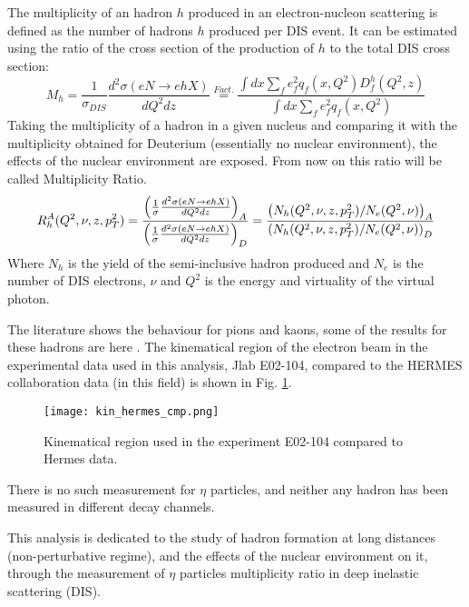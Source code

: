 The multiplicity of an hadron $h$ produced in an electron-nucleon scattering is defined as the number of hadrons $h$ produced per DIS event. It can be estimated using the ratio of the cross section of the production of $h$ to the total DIS cross section:
\begin{equation}
M_h=\frac{1}{\sigma_{DIS}}\frac{d^2 \sigma (eN\rightarrow ehX)}{dQ^2dz}\overset{{\scriptscriptstyle Fact.}}{=}\frac{\int dx \sum_f e_f^2 q_f(x,Q^2) D_f^h (Q^2,z)}{ 
\int dx \sum_f e_f^2 q_f(x,Q^2)}
\label{eq:h_multi}
\end{equation}
Taking the multiplicity of a hadron in a given nucleus and comparing it with the multiplicity obtained for Deuterium (essentially no nuclear environment), the effects of the nuclear environment are exposed. From now on this ratio will be called Multiplicity Ratio.
\begin{equation}
R_h^A(Q^2,\nu,z,p_T^2)=\frac{\left( \frac{1}{\sigma}\frac{d^2 \sigma (eN\rightarrow ehX)}{dQ^2dz} \right)_A}{\left( \frac{1}{\sigma}\frac{d^2 \sigma (eN\rightarrow ehX)}{dQ^2dz} \right)_D}=\frac{\left( N_h(Q^2,\nu,z,p_T^2)/N_e(Q^2,\nu) \right)_A}{\left( N_h(Q^2,\nu,z,p_T^2)/N_e(Q^2,\nu) \right)_D} \label{eq:MR_raw}\\
\end{equation}
Where $N_h$ is the yield of the semi-inclusive hadron produced and $N_e$ is the number of DIS electrons, $\nu$ and $Q^2$ is the energy and virtuality of the  virtual photon.

The literature shows the behaviour for pions and kaons, some of the results for these hadrons are here \cite{Hermes_2007,Hermes_2011}. The kinematical region of the electron beam in the experimental data used in this analysis, Jlab E02-104, compared to the HERMES collaboration data (in this field) is shown in Fig. \ref{fig:hermes_cmp}.

\begin{figure}[!ht]
\centering
\texttt{[image: kin\_hermes\_cmp.png]}
\caption{Kinematical region used in the experiment E02-104 compared to Hermes data\cite{Hermes_2011}.}
\label{fig:hermes_cmp}
\end{figure}

There is no such measurement for $\eta$ particles, and neither any hadron has been measured in different decay channels.

This analysis is dedicated to the study of hadron formation at long distances (non-perturbative regime), and the effects of the nuclear environment on it, through the measurement of $\eta$ particles multiplicity ratio in deep inelastic scattering (DIS).

